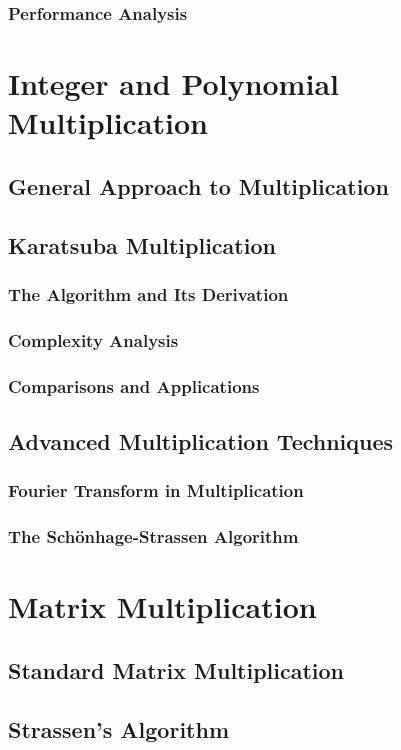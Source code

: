 \documentclass[12pt]{book} %
\begin{document}
\subsubsection{Performance Analysis}

\section{Integer and Polynomial Multiplication}
\subsection{General Approach to Multiplication}
\subsection{Karatsuba Multiplication}
\subsubsection{The Algorithm and Its Derivation}
\subsubsection{Complexity Analysis}
\subsubsection{Comparisons and Applications}
\subsection{Advanced Multiplication Techniques}
\subsubsection{Fourier Transform in Multiplication}
\subsubsection{The Schönhage-Strassen Algorithm}

\section{Matrix Multiplication}
\subsection{Standard Matrix Multiplication}
\subsection{Strassen's Algorithm}
\end{document}

